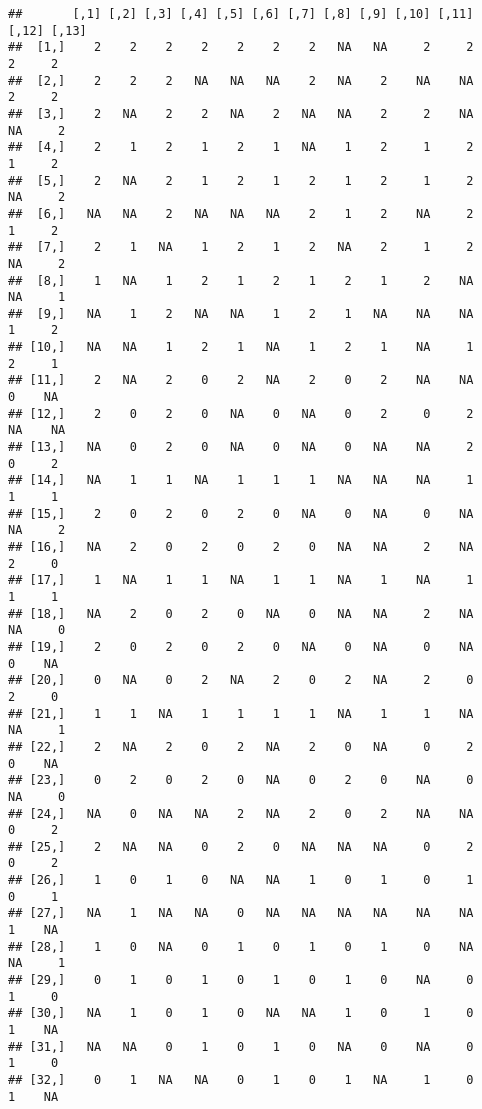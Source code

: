 \documentclass[
]{article}
\begin{document}
\begin{verbatim}
##       [,1] [,2] [,3] [,4] [,5] [,6] [,7] [,8] [,9] [,10] [,11] [,12] [,13]
##  [1,]    2    2    2    2    2    2    2   NA   NA     2     2     2     2
##  [2,]    2    2    2   NA   NA   NA    2   NA    2    NA    NA     2     2
##  [3,]    2   NA    2    2   NA    2   NA   NA    2     2    NA    NA     2
##  [4,]    2    1    2    1    2    1   NA    1    2     1     2     1     2
##  [5,]    2   NA    2    1    2    1    2    1    2     1     2    NA     2
##  [6,]   NA   NA    2   NA   NA   NA    2    1    2    NA     2     1     2
##  [7,]    2    1   NA    1    2    1    2   NA    2     1     2    NA     2
##  [8,]    1   NA    1    2    1    2    1    2    1     2    NA    NA     1
##  [9,]   NA    1    2   NA   NA    1    2    1   NA    NA    NA     1     2
## [10,]   NA   NA    1    2    1   NA    1    2    1    NA     1     2     1
## [11,]    2   NA    2    0    2   NA    2    0    2    NA    NA     0    NA
## [12,]    2    0    2    0   NA    0   NA    0    2     0     2    NA    NA
## [13,]   NA    0    2    0   NA    0   NA    0   NA    NA     2     0     2
## [14,]   NA    1    1   NA    1    1    1   NA   NA    NA     1     1     1
## [15,]    2    0    2    0    2    0   NA    0   NA     0    NA    NA     2
## [16,]   NA    2    0    2    0    2    0   NA   NA     2    NA     2     0
## [17,]    1   NA    1    1   NA    1    1   NA    1    NA     1     1     1
## [18,]   NA    2    0    2    0   NA    0   NA   NA     2    NA    NA     0
## [19,]    2    0    2    0    2    0   NA    0   NA     0    NA     0    NA
## [20,]    0   NA    0    2   NA    2    0    2   NA     2     0     2     0
## [21,]    1    1   NA    1    1    1    1   NA    1     1    NA    NA     1
## [22,]    2   NA    2    0    2   NA    2    0   NA     0     2     0    NA
## [23,]    0    2    0    2    0   NA    0    2    0    NA     0    NA     0
## [24,]   NA    0   NA   NA    2   NA    2    0    2    NA    NA     0     2
## [25,]    2   NA   NA    0    2    0   NA   NA   NA     0     2     0     2
## [26,]    1    0    1    0   NA   NA    1    0    1     0     1     0     1
## [27,]   NA    1   NA   NA    0   NA   NA   NA   NA    NA    NA     1    NA
## [28,]    1    0   NA    0    1    0    1    0    1     0    NA    NA     1
## [29,]    0    1    0    1    0    1    0    1    0    NA     0     1     0
## [30,]   NA    1    0    1    0   NA   NA    1    0     1     0     1    NA
## [31,]   NA   NA    0    1    0    1    0   NA    0    NA     0     1     0
## [32,]    0    1   NA   NA    0    1    0    1   NA     1     0     1    NA

\end{verbatim}
\end{document}
